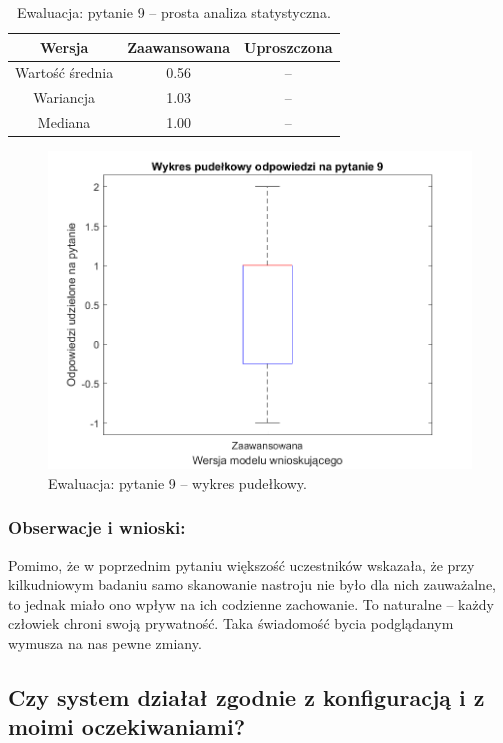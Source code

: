 	\begin{table}[!h]
		\caption{Ewaluacja: pytanie 9 -- prosta analiza statystyczna.}
		\centering
		\begin{tabular}{|c|c|c|}
			\hline
			Wersja          & Zaawansowana & Uproszczona \\ \hline
			Wartość średnia & 0.56         & --          \\ \hline
			Wariancja       & 1.03         & --          \\ \hline
			Mediana         & 1.00         & --          \\ \hline
		\end{tabular}
	\end{table}
	
	\begin{figure}[H]
		\centering
		\includegraphics[scale=0.8]{rozdzial5/Ewaluacja9.png}
		\caption{Ewaluacja: pytanie 9 -- wykres pudełkowy.}
	\end{figure}
	
	\subsubsection{Obserwacje i wnioski:}
	
	Pomimo, że w poprzednim pytaniu większość uczestników wskazała, że przy kilkudniowym badaniu samo skanowanie nastroju nie było dla nich zauważalne, to jednak miało ono wpływ na ich codzienne zachowanie. To naturalne -- każdy człowiek chroni swoją prywatność. Taka świadomość bycia podglądanym wymusza na nas pewne zmiany.
	
	
\subsection{Czy system działał zgodnie z konfiguracją i z moimi oczekiwaniami?}
	
